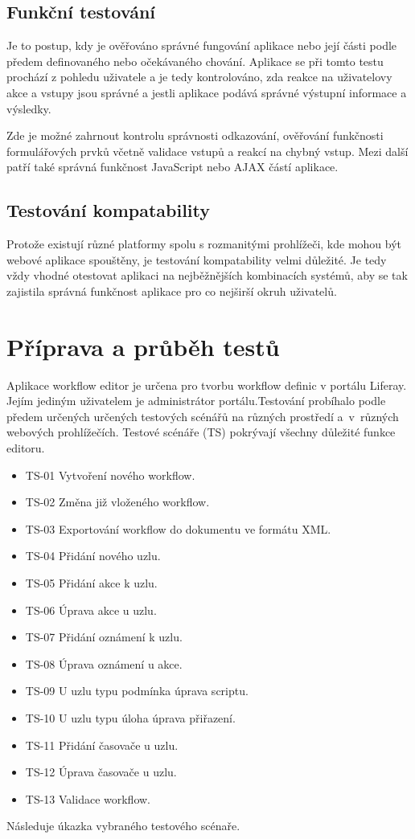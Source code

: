 \documentclass{fithesis}
\begin{document}
\subsection*{Funkční testování}
Je to postup, kdy je ověřováno správné fungování aplikace nebo její části podle předem definovaného nebo očekávaného chování. Aplikace se při tomto testu prochází z pohledu uživatele a je tedy kontrolováno, zda reakce na uživatelovy akce a vstupy jsou správné a jestli aplikace podává správné výstupní informace a výsledky.

Zde je možné zahrnout kontrolu správnosti odkazování, ověřování funkčnosti formulářových prvků včetně validace vstupů a reakcí na chybný vstup. Mezi další patří také správná funkčnost JavaScript nebo AJAX částí aplikace.

\subsection*{Testování kompatability}
Protože existují různé platformy spolu s rozmanitými prohlížeči, kde mohou být webové aplikace spouštěny, je testování kompatability velmi důležité. Je tedy vždy vhodné otestovat aplikaci na nejběžnějších kombinacích systémů, aby se tak zajistila správná funkčnost aplikace pro co nejširší okruh uživatelů.

\section{Příprava a průběh testů}
Aplikace workflow editor je určena pro tvorbu workflow definic v portálu Liferay. Jejím jediným uživatelem je administrátor portálu.Testování probíhalo podle předem určených určených testových scénářů na různých prostředí a~v~různých webových prohlížečích. Testové scénáře (TS) pokrývají všechny důležité funkce editoru. 
\begin{itemize}
\item TS-01 Vytvoření nového workflow.
\item TS-02 Změna již vloženého workflow.
\item TS-03 Exportování workflow do dokumentu ve formátu XML.
\item TS-04 Přidání nového uzlu.
\item TS-05 Přidání akce k uzlu.
\item TS-06 Úprava akce u uzlu.
\item TS-07 Přidání oznámení k uzlu.
\item TS-08 Úprava oznámení u akce.
\item TS-09 U uzlu typu podmínka úprava scriptu.
\item TS-10 U uzlu typu úloha úprava přiřazení.
\item TS-11 Přidání časovače u uzlu.
\item TS-12 Úprava časovače u uzlu.
\item TS-13 Validace workflow.
\end{itemize}
Následuje úkazka vybraného testového scénaře.
\end{document}
